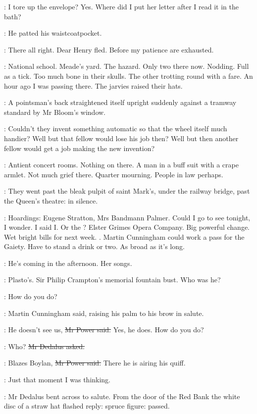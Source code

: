 \BloomInt:
I tore up the envelope?
Yes.
Where did I put her letter after I read it in the bath?

:
He patted his waistcoatpocket.

\BloomInt:
There all right.
Dear Henry fled.
Before my patience are exhausted.

\BloomInt:
National school.
Meade's yard.
The hazard.
Only two there now.
Nodding.
Full as a tick.
Too much bone in their skulls.
The other trotting round with a fare.
An hour ago I was passing there.
The jarvies raised their hats.

:
A pointsman's back straightened itself upright
suddenly against a tramway standard
by Mr Bloom's window.

\BloomInt:
Couldn't they invent something automatic so that the wheel itself much handier?
Well but that fellow would lose his job then?
Well but then another fellow would get a job making the new invention?

\BloomInt:
Antient concert rooms.
Nothing on there.
A man in a buff suit with a crape armlet.
Not much grief there.
Quarter mourning.
People in law perhaps.

:
They went past the bleak pulpit of saint Mark's,
under the railway bridge,
past the Queen's theatre:
in silence.

\BloomInt:
Hoardings:
Eugene Stratton,
Mrs Bandmann Palmer.
Could I go to see  tonight, I wonder.
I said I.
Or the ?
Elster Grimes Opera Company.
Big powerful change.
Wet bright bills for next week.
.
Martin Cunningham could work a pass for the Gaiety.
Have to stand a drink or two.
As broad as it's long.

\BloomInt:
He's coming in the afternoon.
Her songs.

\BloomInt:
Plasto's.
Sir Philip Crampton's memorial fountain bust.
Who was he?

\cunningham:
How do you do?

:
Martin Cunningham said,
raising his palm to his brow in salute.

\power:
He doesn't see us,
\sout{Mr Power said.}
Yes, he does.
How do you do?

\simon:
Who?
\sout{Mr Dedalus asked.}

\power:
Blazes Boylan,
\sout{Mr Power said.}
There he is airing his quiff.

\BloomInt:
Just that moment I was thinking.

:
Mr Dedalus bent across to salute.
From the door of the Red Bank the white disc of a straw hat flashed reply:
spruce figure:
passed.

